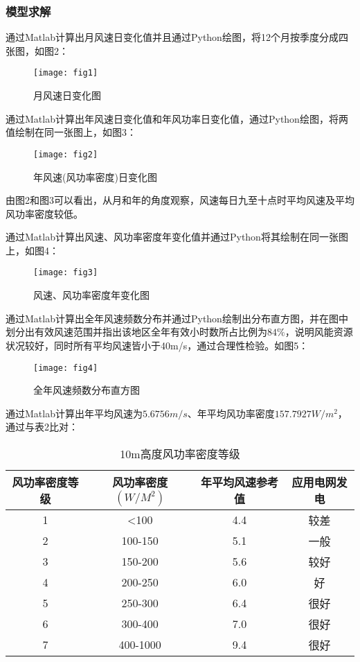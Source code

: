 \documentclass[withoutpreface,bwprint]{cumcmthesis} %
\begin{document}
		\subsubsection{模型求解}
		通过Matlab计算出月风速日变化值并且通过Python绘图，将12个月按季度分成四张图，如图2：
		\begin{figure}[!htbp]
			\centering
			\texttt{[image: fig1]}
			\caption{月风速日变化图}
			\label{fig:month_day}
		\end{figure}\par
		通过Matlab计算出年风速日变化值和年风功率日变化值，通过Python绘图，将两值绘制在同一张图上，如图3：
		\begin{figure}[!htbp]
			\centering
			\texttt{[image: fig2]}
			\caption{年风速(风功率密度)日变化图}
			\label{fig:year_day}
		\end{figure}\par
		由图2和图3可以看出，从月和年的角度观察，风速每日九至十点时平均风速及平均风功率密度较低。\par
		通过Matlab计算出风速、风功率密度年变化值并通过Python将其绘制在同一张图上，如图4：
		\begin{figure}[!htbp]
			\centering
			\texttt{[image: fig3]}
			\caption{风速、风功率密度年变化图}
			\label{fig:year}
		\end{figure}\par
		通过Matlab计算出全年风速频数分布并通过Python绘制出分布直方图，并在图中划分出有效风速范围并指出该地区全年有效小时数所占比例为$84\%$，说明风能资源状况较好，同时所有平均风速皆小于40m/s，通过合理性检验。如图5：
		\begin{figure}[!htbp]
			\centering
			\texttt{[image: fig4]}
			\caption{全年风速频数分布直方图}
			\label{fig:fenbu}
		\end{figure}\par
		通过Matlab计算出年平均风速为$5.6756m/s$、年平均风功率密度$157.7927W/m^2$，通过与表2\supercite{风能资源评估和机组选型在风电场选址中的应用}比对：
		\begin{table}[!htbp]
			\caption{10m高度风功率密度等级}\label{tab:001} \centering
			\begin{tabular}{cccc}
				\toprule[1.5pt]
				风功率密度等级 & 风功率密度$(W/M^2)$ & 年平均风速参考值 & 应用电网发电\\
				\midrule[1pt]
				1 & <100 & 4.4 & 较差 \\
				2 & 100-150 & 5.1 & 一般 \\
				3 & 150-200 & 5.6 & 较好 \\
				4 & 200-250 & 6.0 & 好 \\
				5 & 250-300 & 6.4 & 很好 \\
				6 & 300-400 & 7.0 & 很好 \\
				7 & 400-1000 & 9.4 & 很好 \\
				\bottomrule[1.5pt]
			\end{tabular}
		\end{table}\par
\end{document}
